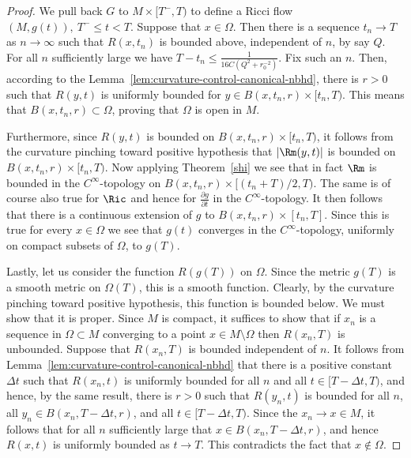 \begin{proof}
 We pull back $G$ to $M\times [T^-,T)$ to define a Ricci flow
$(M,g(t)),\ T^{-}\le t<T$. Suppose that $x\in \Omega$. Then there is
a sequence $t_n\rightarrow T$ as $n\rightarrow \infty$ such that
$R(x,t_n)$ is bounded above, independent of $n$, by say $Q$. For all
$n$ sufficiently large we have $T-t_n\le
\frac{1}{16C(Q^2+r_0^{-2})}$. Fix such an $n$. Then, according to
the Lemma~\ref{lem:curvature-control-canonical-nbhd}, there is $r>0$ such that $R(y,t)$ is
uniformly bounded for $y\in B(x,t_n,r)\times [t_n,T)$. This means
that $B(x,t_n,r)\subset \Omega$, proving that $\Omega$ is open in
$M$.

Furthermore, since $R(y,t)$ is bounded on $B(x,t_n,r)\times
[t_n,T)$, it follows from the curvature pinching toward positive
hypothesis that $|\Rm(y,t)|$ is bounded on
$B(x,t_n,r)\times[t_n,T)$. Now applying Theorem~\ref{shi} we see
that in fact $\Rm$ is bounded in the $C^\infty$-topology on
$B(x,t_n,r)\times[(t_n+T)/2 ,T)$. The same is of course also true
for $\Ric$ and hence for $\frac{\partial g}{\partial t}$ in the
$C^\infty$-topology. It then follows that there is a continuous
extension of $g$ to $B(x,t_n,r)\times [t_n,T]$.  Since this is true
for every $x\in \Omega$ we see that $g(t)$ converges in the
$C^\infty$-topology, uniformly on compact subsets of $\Omega$, to
$g(T)$.

Lastly, let us consider the function $R(g(T))$ on $\Omega$. Since
the metric $g(T)$ is a smooth metric on $\Omega(T)$, this is a
smooth function. Clearly, by the curvature pinching toward positive
hypothesis, this function is bounded below. We must show that it is
proper. Since $M$ is compact, it suffices to show that if $x_n$ is a
sequence in $\Omega\subset M$ converging to a point $x\in M\setminus
\Omega$ then $R(x_n,T)$ is unbounded. Suppose that $R(x_n,T)$ is
bounded independent of $n$. It follows from Lemma~\ref{lem:curvature-control-canonical-nbhd}
that there is a positive constant $\Delta t$ such that $R(x_n,t)$ is
uniformly bounded for all $n$ and all $t\in [T-\Delta t,T)$, and
hence, by the same result, there is $r>0$ such that $R(y_n, t)$ is
bounded for all $n$,  all $y_n\in B(x_n,T-\Delta t,r)$, and all
$t\in [T-\Delta t,T)$. Since the $x_n\rightarrow x\in M$, it follows
that for all $n$ sufficiently large that $x\in B(x_n,T-\Delta t,r)$,
and hence $R(x,t)$ is uniformly bounded as $t\rightarrow T$. This
contradicts the fact that $x\not\in \Omega$.
\end{proof}







